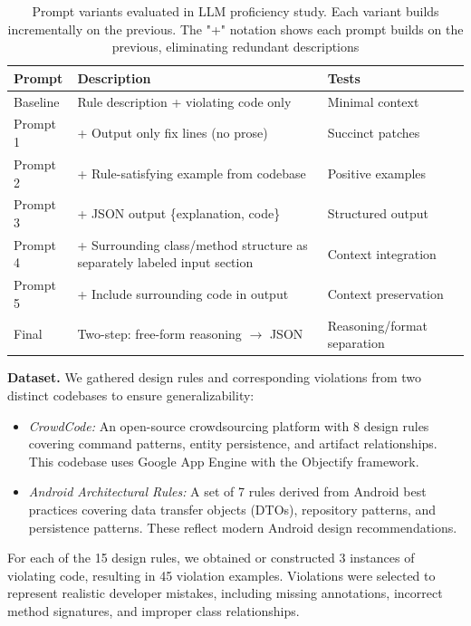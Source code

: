 \documentclass[conference]{IEEEtran}
\begin{document}
\begin{table}[t]
\caption{Prompt variants evaluated in LLM proficiency study. Each variant builds incrementally on the previous. The "+" notation shows each prompt builds on the previous, eliminating redundant descriptions}
\label{tab:prompts}
\centering
\scriptsize
\setlength{\tabcolsep}{3pt}
\begin{tabular}{l p{} l}
\toprule
\textbf{Prompt} & \textbf{Description} & \textbf{Tests} \\
\midrule
Baseline & Rule description + violating code only & Minimal context \\
Prompt 1 & + Output only fix lines (no prose) & Succinct patches \\
Prompt 2 & + Rule-satisfying example from codebase & Positive examples \\
Prompt 3 & + JSON output \{explanation, code\} & Structured output \\
Prompt 4 & + Surrounding class/method structure as separately labeled 
input section & Context integration \\
Prompt 5 & + Include surrounding code in output & Context preservation \\
\midrule
Final & Two-step: free-form reasoning $\rightarrow$ JSON & Reasoning/format separation \\
\bottomrule
\end{tabular}
\end{table}


\textbf{Dataset.} We gathered design rules and corresponding violations from two distinct codebases to ensure generalizability:

\begin{itemize}
\item \textit{CrowdCode:} An open-source crowdsourcing platform with 8 design rules covering command patterns, entity persistence, and artifact relationships. This codebase uses Google App Engine with the Objectify framework.
\item \textit{Android Architectural Rules:} A set of 7 rules derived from Android best practices covering data transfer objects (DTOs), repository patterns, and persistence patterns. These reflect modern Android design recommendations.
\end{itemize}

For each of the 15 design rules, we obtained or constructed 3 instances of violating code, resulting in 45 violation examples. Violations were selected to represent realistic developer mistakes, including missing annotations, incorrect method signatures, and improper class relationships.
\end{document}
